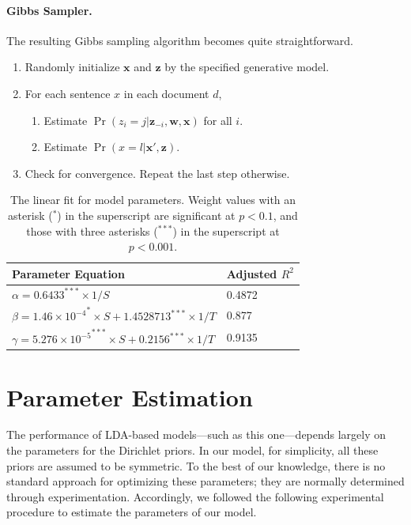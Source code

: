 
\paragraph{Gibbs Sampler.}  
The resulting Gibbs sampling algorithm becomes quite straightforward.
\begin{enumerate}
  \item Randomly initialize $\mathbf{x}$ and $\mathbf{z}$ by the specified generative model.
  \item For each sentence $x$ in each document $d$, \begin{enumerate}
    \item Estimate $\Pr(z_i = j|\mathbf{z}_{-i}, \mathbf{w}, \mathbf{x})$ for all $i$.
    \item Estimate $\Pr(x = l|\mathbf{x}',\mathbf{z})$.
  \end{enumerate}
  \item Check for convergence.  Repeat the last step otherwise.
\end{enumerate}

\begin{table}[!ht]
  \centering
  \begin{tabular}{ll}
    Parameter Equation &  Adjusted $R^2$ \\
    \hline
    $\alpha = 0.6433^{***} \times 1/S$ & 0.4872 \\
    $\beta = 1.46 \times {10^{-4}}^{*} \times S + 1.4528713^{***} \times 1/T$ & 0.877 \\
    $\gamma = 5.276 \times {10^{-5}}^{***} \times S + 0.2156^{***} \times 1/T $& 0.9135 
  \end{tabular}

  \caption{The linear fit for model parameters.  Weight values with
  an asterisk ($^*$) in the superscript are significant at $p < 0.1$, and those
  with three asterisks ($^{***}$) in the superscript at $p < 0.001$.} \label{t:model-parameters}
\end{table}

\section{Parameter Estimation} \label{s:parameter-estimation} The performance
of LDA-based models---such as this one---depends largely on the parameters for
the Dirichlet priors.  In our model, for simplicity, all these priors are
assumed to be symmetric.  To the best of our knowledge, there is no standard
approach for optimizing these parameters; they are normally determined through
experimentation.  Accordingly, we followed the following experimental procedure
to estimate the parameters of our model.

